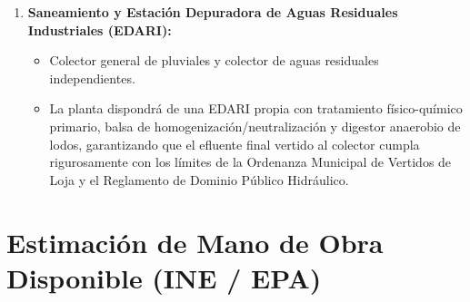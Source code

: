 \documentclass{report}
\begin{document}
\begin{enumerate}
\begin{itemize}
              \item Caudal asignado de hasta \SI{12.0}{\litre/\second}, respaldado por los acuíferos de la Sierra de Loja bajo concesión de la CHG.
          \end{itemize}
    \item \textbf{Saneamiento y Estación Depuradora de Aguas Residuales Industriales (EDARI):}
          \begin{itemize}
              \item Colector general de pluviales y colector de aguas residuales independientes.
              \item La planta dispondrá de una EDARI propia con tratamiento físico-químico primario, balsa de homogenización/neutralización y digestor anaerobio de lodos, garantizando que el efluente final vertido al colector cumpla rigurosamente con los límites de la Ordenanza Municipal de Vertidos de Loja y el Reglamento de Dominio Público Hidráulico.
          \end{itemize}
\end{enumerate}

\chapter{Estimación de Mano de Obra Disponible (INE / EPA)}
\end{document}
